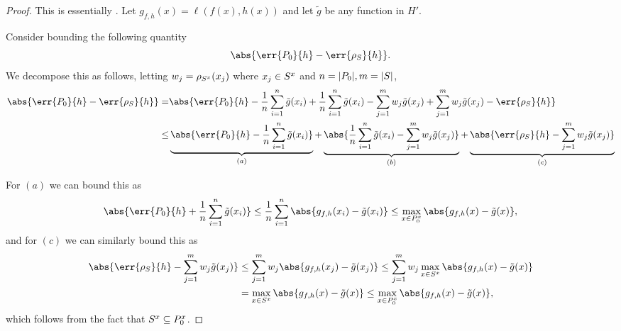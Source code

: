 \begin{proof}
  This is essentially \cite[Proof of Theorem 1]{viering17_nuclear_discr_activ_learn}.
  Let \(g_{f, h}(x) = \ell(f(x), h(x))\) and let \(\tilde{g}\) be any function in
  \(H'\).

  Consider bounding the following quantity
  \begin{equation*}
    \abs{\err{\poolset_0}{h} - \err{\rho_{\trainset}}{h}}.
  \end{equation*}
  We decompose this as follows, letting \(w_{j} = \rho_{S^x}(x_j)\) where
  \(x_j \in S^x\) and \(n = |P_0|, m = |S|\),
  \begin{align*}
    \abs{\err{\poolset_0}{h} - \err{\rho_{\trainset}}{h}} = & \abs{\err{\poolset_0}{h} - \frac{1}{n} \sum_{i=1}^n\tilde{g}(x_i) + \frac{1}{n} \sum_{i=1}^n\tilde{g}(x_i) - \sum_{j=1}^m w_j \tilde{g}(x_j) + \sum_{j=1}^m w_j \tilde{g}(x_j) - \err{\rho_{\trainset}}{h}} \\
    \leq & \underbrace{\abs{\err{\poolset_0}{h} - \frac{1}{n} \sum_{i=1}^n\tilde{g}(x_i)}}_{(a)} + \underbrace{\abs{\frac{1}{n} \sum_{i=1}^n\tilde{g}(x_i) - \sum_{j=1}^m w_j \tilde{g}(x_j)}}_{(b)} + \underbrace{\abs{\err{\rho_{\trainset}}{h} - \sum_{j=1}^m w_j \tilde{g}(x_j)}}_{(c)}
  \end{align*}

  For \((a)\) we can bound this as
  \begin{equation*}
    \abs{\err{\poolset_0}{h} + \frac{1}{n} \sum_{i=1}^n\tilde{g}(x_i)} \leq \frac{1}{n} \sum_{i=1}^{n}\abs{g_{f, h}(x_{i}) - \tilde{g}(x_{i})} \leq \max_{x \in \poolsetx_0}\abs{g_{f, h}(x) - \tilde{g}(x)},
  \end{equation*}
  and for \((c)\) we can similarly bound this as
  \begin{align*}
    \abs{\err{\rho_{\trainset}}{h} - \sum_{j=1}^m w_j \tilde{g}(x_j)} & \leq \sum_{j=1}^{m} w_{j}\abs{g_{f, h}(x_{j}) - \tilde{g}(x_{j})} \leq \sum_{j=1}^{m}w_{j}\max_{x \in \trainsetx}\abs{g_{f, h}(x) - \tilde{g}(x)} \\
                                                                      & = \max_{x \in \trainsetx}\abs{g_{f, h}(x) - \tilde{g}(x)} \leq \max_{x \in \poolsetx_0}\abs{g_{f, h}(x) - \tilde{g}(x)},
  \end{align*}
  which follows from the fact that \(S^x \subseteq P^x_{0}\).


\end{proof}
